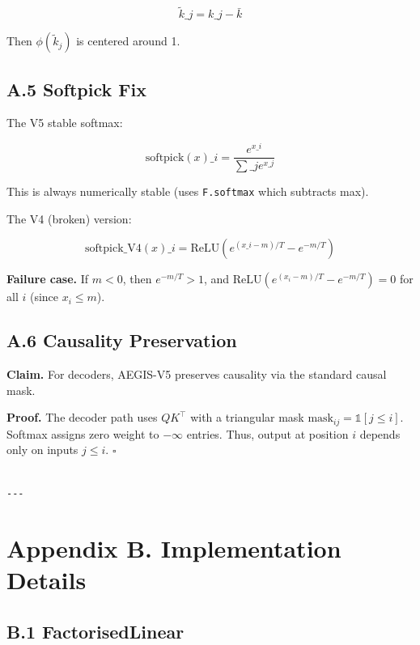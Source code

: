 \[
\tilde{k}\_j = k\_j - \bar{k}
\]

Then $\phi(\tilde{k}_j)$ is centered around 1.

\subsection{A.5 Softpick Fix}

The V5 stable softmax:

\[
\text{softpick}(x)\_i = \frac{e^{x\_i}}{\sum\_j e^{x\_j}}
\]

This is always numerically stable (uses \texttt{F.softmax} which subtracts max).

The V4 (broken) version:

\[
\text{softpick}\_\text{V4}(x)\_i = \text{ReLU}\!\left(e^{(x\_i - m)/T} - e^{-m/T}\right)
\]

\textbf{Failure case.} If $m < 0$, then $e^{-m/T} > 1$, and 
$\text{ReLU}(e^{(x_i - m)/T} - e^{-m/T}) = 0$ for all $i$ (since 
$x_i \leq m$).

\subsection{A.6 Causality Preservation}

\textbf{Claim.} For decoders, AEGIS-V5 preserves causality via the standard 
causal mask.

\textbf{Proof.} The decoder path uses $Q K^\top$ with a triangular mask 
$\text{mask}_{ij} = \mathbb{1}[j \leq i]$. Softmax assigns zero weight to 
$-\infty$ entries. Thus, output at position $i$ depends only on inputs 
$j \leq i$. $\square$
\begin{lstlisting}

---
\end{lstlisting}

\section{Appendix B. Implementation Details}

\subsection{B.1 FactorisedLinear}

